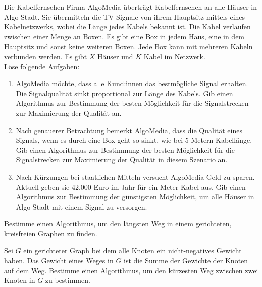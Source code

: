 \documentclass{uebung_cs}
\begin{document}
\begin{aufgabe}
	Die Kabelfernsehen-Firma AlgoMedia überträgt Kabelfernsehen an alle Häuser in Algo-Stadt.
	Sie übermitteln die TV Signale von ihrem Hauptsitz mittels eines Kabelnetzwerks, wobei die Länge jedes Kabels bekannt ist.
	Die Kabel verlaufen zwischen einer Menge an Boxen.
	Es gibt eine Box in jedem Haus, eine in dem Hauptsitz und sonst keine weiteren Boxen.
	Jede Box kann mit mehreren Kabeln verbunden werden. Es gibt $X$ Häuser und $K$ Kabel im Netzwerk.\\
	Löse folgende Aufgaben:
	\begin{enumerate}
		\item AlgoMedia möchte, dass alle Kund:innen das bestmögliche Signal erhalten.
		Die Signalqualität sinkt proportional zur Länge des Kabels.
		Gib einen Algorithmus zur Bestimmung der besten Möglichkeit für die Signalstrecken zur Maximierung der Qualität an.
		\item Nach genauerer Betrachtung bemerkt AlgoMedia, dass die Qualität eines Signals, wenn es durch eine Box geht so sinkt, wie bei 5 Metern Kabellänge.
		Gib einen Algorithmus zur Bestimmung der besten Möglichkeit für die Signalstrecken zur Maximierung der Qualität in diesem Szenario an.
		\item Nach Kürzungen bei staatlichen Mitteln versucht AlgoMedia Geld zu sparen.
		Aktuell geben sie 42.000 Euro im Jahr für ein Meter Kabel aus.
		Gib einen Algorithmus zur Bestimmung der günstigsten Möglichkeit, um alle Häuser in Algo-Stadt mit einem Signal zu versorgen.
	\end{enumerate}
\end{aufgabe}


\begin{aufgabe}
	Bestimme einen Algorithmus, um den längsten Weg in einem gerichteten, kreisfreien Graphen zu finden.
\end{aufgabe}

\begin{aufgabe}
	Sei $G$ ein gerichteter Graph bei dem alle Knoten ein nicht-negatives Gewicht haben.
	Das Gewicht eines Weges in $G$ ist die Summe der Gewichte der Knoten auf dem Weg.
	Bestimme einen Algorithmus, um den kürzesten Weg zwischen zwei Knoten in $G$ zu bestimmen.
\end{aufgabe}
\end{document}
